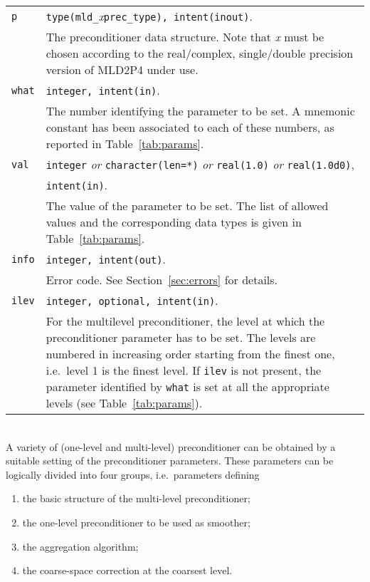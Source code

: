 \begin{tabular}{p{1.2cm}p{10.6cm}}
\verb|p|      & \verb|type(mld_|\emph{x}\verb|prec_type), intent(inout)|.\\
              & The preconditioner data structure. Note that \emph{x} must be chosen according
                to the real/complex, single/double precision version of MLD2P4 under use.\\
\verb|what|   & \verb|integer, intent(in)|. \\
              & The number identifying the parameter to be set.
                A mnemonic constant has been associated to each of these
                numbers, as reported in Table~\ref{tab:params}.\\
\verb|val |   & \verb|integer| \emph{or} \verb|character(len=*)| \emph{or} \verb|real(1.0)|
                \emph{or} \verb|real(1.0d0)|,\\
              & \verb|intent(in)|.\\
              & The value of the parameter to be set. The list of allowed
                values and the corresponding data types is given in Table~\ref{tab:params}.\\
\verb|info|   & \verb|integer, intent(out)|.\\
              & Error code. See Section~\ref{sec:errors} for details.\\
\verb|ilev|   & \verb|integer, optional, intent(in)|.\\
              & For the multilevel preconditioner, the level at which the
                preconditioner parameter has to be set. The levels are numbered in increasing
                order starting from the finest one, i.e.\ level 1 is the finest level.
                If \verb|ilev| is not present, the parameter identified by \verb|what|
                is set at all the appropriate levels (see Table~\ref{tab:params}).
\end{tabular}

\ \\
A variety of (one-level and multi-level) preconditioner can be obtained by a suitable
setting of the preconditioner parameters. These parameters can be logically divided into
four groups, i.e.\ parameters defining
\begin{enumerate}
	\item the basic structure of the multi-level preconditioner;
	\item the one-level preconditioner to be used as smoother;
	\item the aggregation algorithm;
	\item the coarse-space correction at the coarsest level.
\end{enumerate}

